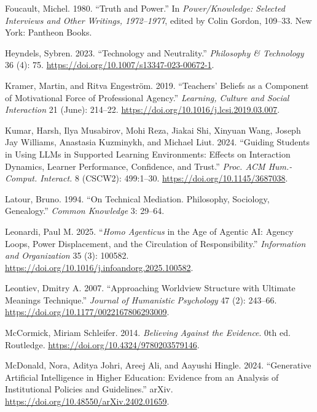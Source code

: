 \documentclass[
  letterpaper,
  DIV=11,
  numbers=noendperiod]{scrartcl}
\newlength{\cslhangindent}
\newenvironment{CSLReferences}[2] %
 {\begin{list}{}{%
  \setlength{\itemindent}{0pt}
  \setlength{\leftmargin}{0pt}
  \setlength{\parsep}{0pt}
  \ifodd #1
   \setlength{\leftmargin}{\cslhangindent}
   \setlength{\itemindent}{-1\cslhangindent}
  \fi
  \setlength{\itemsep}{#2\baselineskip}}}
 {\end{list}}
\begin{document}
\begin{CSLReferences}{1}{0}
Foucault, Michel. 1980. {``Truth and Power.''} In \emph{Power/Knowledge:
{Selected} Interviews and Other Writings, 1972--1977}, edited by Colin
Gordon, 109--33. New York: Pantheon Books.

Heyndels, Sybren. 2023. {``Technology and {Neutrality}.''}
\emph{Philosophy \& Technology} 36 (4): 75.
\url{https://doi.org/10.1007/s13347-023-00672-1}.

Kramer, Martin, and Ritva Engeström. 2019. {``Teachers' Beliefs as a
Component of Motivational Force of Professional Agency.''}
\emph{Learning, Culture and Social Interaction} 21 (June): 214--22.
\url{https://doi.org/10.1016/j.lcsi.2019.03.007}.

Kumar, Harsh, Ilya Musabirov, Mohi Reza, Jiakai Shi, Xinyuan Wang,
Joseph Jay Williams, Anastasia Kuzminykh, and Michael Liut. 2024.
{``Guiding {Students} in {Using LLMs} in {Supported Learning
Environments}: {Effects} on {Interaction Dynamics}, {Learner
Performance}, {Confidence}, and {Trust}.''} \emph{Proc. ACM Hum.-Comput.
Interact.} 8 (CSCW2): 499:1--30. \url{https://doi.org/10.1145/3687038}.

Latour, Bruno. 1994. {``On Technical Mediation. {Philosophy}, Sociology,
Genealogy.''} \emph{Common Knowledge} 3: 29--64.

Leonardi, Paul M. 2025. {``{\emph{Homo Agenticus}} in the Age of Agentic
{AI}: {Agency} Loops, Power Displacement, and the Circulation of
Responsibility.''} \emph{Information and Organization} 35 (3): 100582.
\url{https://doi.org/10.1016/j.infoandorg.2025.100582}.

Leontiev, Dmitry A. 2007. {``Approaching {Worldview Structure} with
{Ultimate Meanings Technique}.''} \emph{Journal of Humanistic
Psychology} 47 (2): 243--66.
\url{https://doi.org/10.1177/0022167806293009}.

McCormick, Miriam Schleifer. 2014. \emph{Believing {Against} the
{Evidence}}. 0th ed. Routledge.
\url{https://doi.org/10.4324/9780203579146}.

McDonald, Nora, Aditya Johri, Areej Ali, and Aayushi Hingle. 2024.
{``Generative {Artificial Intelligence} in {Higher Education}:
{Evidence} from an {Analysis} of {Institutional Policies} and
{Guidelines}.''} arXiv. \url{https://doi.org/10.48550/arXiv.2402.01659}.


\end{CSLReferences}
\end{document}
